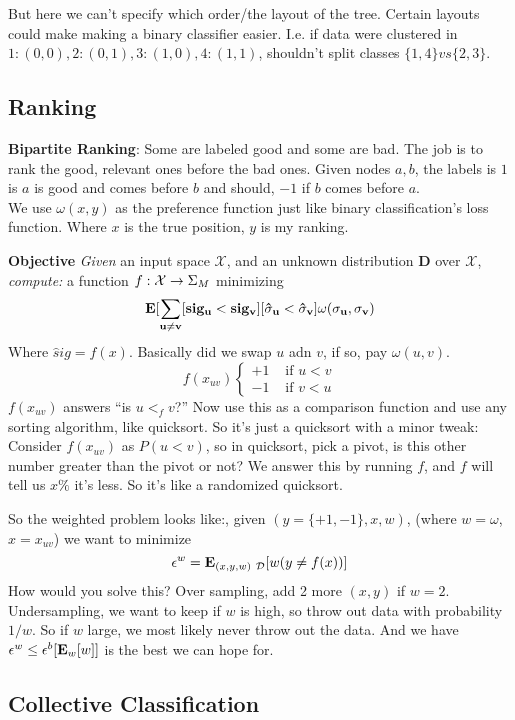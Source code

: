 But here we can't specify which order/the layout of the tree. Certain
layouts could make making a binary classifier easier. I.e. if data
were clustered in $1:(0,0), 2:(0,1), 3:(1,0), 4:(1,1)$, shouldn't
split classes $\{1,4\} vs \{2,3\}$.

\subsection{Ranking}
\label{sec:ranking}
\textbf{Bipartite Ranking}: Some are labeled good and some are
bad. The job is to rank the good, relevant ones before the bad
ones. Given nodes $a,b$, the labels is $1$ is $a$ is good and comes before $b$ and
should, $-1$ if $b$ comes before $a$.\\
We use $\omega(x,y)$ as the preference function just like binary classification's loss
function. Where $x$ is the true position, $y$ is my ranking.

\textbf{Objective}
\emph{Given} an input space $\mathcal{X}$, and an unknown distribution
$\mathbf{D}$ over $\mathcal{X}$, \emph{compute:} a function
$f:\mathcal{X}\rightarrow \Sigma_M$ minimizing $$\mathbf{E[\sum_{u\neq
    v}[sig_u<sig_v][\hat {\sigma}_u < \hat {\sigma}_v]\omega(\sigma_u,\sigma_v)}$$
Where $\hat sig = f(x)$. Basically did we swap $u$ adn $v$, if so, pay
$\omega(u,v)$.
$$f(x_{uv}) \begin{cases}
  +1& \text{ if } u<v\\
-1&\text{ if }v < u
\end{cases}$$
$f(x_{uv})$ answers ``is $u<_fv$?'' Now use this as a comparison
function and use any sorting algorithm, like quicksort. So it's just a
quicksort with a minor tweak:\\

Consider $f(x_{uv})$ as $P(u<v)$, so in quicksort, pick a pivot, is
this other number greater than the pivot or not? We answer this by
running $f$, and $f$ will tell us $x\%$ it's less. So it's like a
randomized quicksort.

So the weighted problem looks like:, given $(y=\{+1,-1\},x,w)$, (where
$w=\omega$, $x= x_{uv}$) we want to minimize
$$\epsilon^w = \mathbf{E}_{(x,y,w)~\mathcal{D}}[w(y\neq f(x))]$$
How would you solve this? Over sampling, add 2 more $(x,y)$ if
$w=2$. Undersampling, we want to keep if $w$ is high, so throw out
data with probability $1/w$. So if $w$ large, we most likely never
throw out the data. And we have $\epsilon^w \le \epsilon^b[\mathbf{E}_w[w]]$
is the best we can hope for.

\subsection{Collective Classification}
\label{sec:collectiveclassification}

